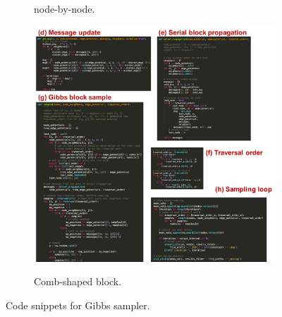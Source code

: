 \documentclass{article}
\begin{document}
\begin{figure}[h]
\begin{subfigure}[t]{0.3\textwidth}
\vspace{-0.6cm}
\label{f:code_node}
\caption{node-by-node.}
\end{subfigure} \hspace{0.02\textwidth}
%
\begin{subfigure}[t]{0.65\textwidth}
\centering
\includegraphics[width=\textwidth]{./computational/code_screenshots/code_2.pdf}
\vspace{-0.6cm}
\label{f:code_block}
\caption{Comb-shaped block.}
\end{subfigure}
%
\caption{Code snippets for Gibbs sampler.}
\label{f:code}
\end{figure}

\pagebreak
\end{document}
